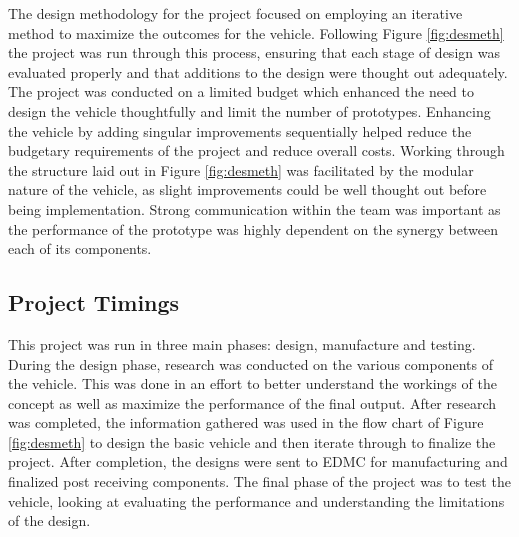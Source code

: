 The design methodology for the project focused on employing an iterative method to maximize the outcomes for the vehicle. Following Figure \ref{fig:desmeth} the project was run through this process, ensuring that each stage of design was evaluated properly and that additions to the design were thought out adequately. The project was conducted on a limited budget which enhanced the need to design the vehicle thoughtfully and limit the number of prototypes. Enhancing the vehicle by adding singular improvements sequentially helped reduce the budgetary requirements of the project and reduce overall costs. Working through the structure laid out in Figure \ref{fig:desmeth} was facilitated by the modular nature of the vehicle, as slight improvements could be well thought out before being implementation. Strong communication within the team was important as the performance of the prototype was highly dependent on the synergy between each of its components.

\subsection{Project Timings}


This project was run in three main phases: design, manufacture and testing. During the design phase, research was conducted on the various components of the vehicle. This was done in an effort to better understand the workings of the concept as well as maximize the performance of the final output. After research was completed, the information gathered was used in the flow chart of Figure \ref{fig:desmeth} to design the basic vehicle and then iterate through to finalize the project. After completion, the designs were sent to EDMC for manufacturing and finalized post receiving components. The final phase of the project was to test the vehicle, looking at evaluating the performance and understanding the limitations of the design.


